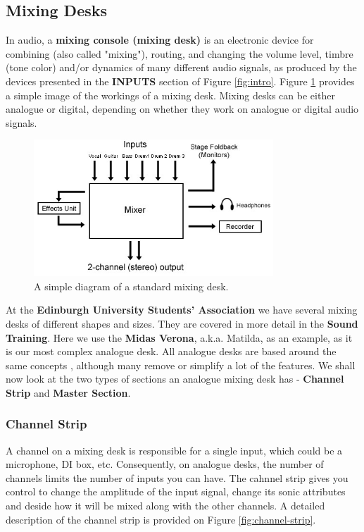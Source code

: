 \documentclass[14pt,twocolumn]{extarticle} %
\begin{document}
\subsection{Mixing Desks}
\label{mixing-desks}
In audio, a \textbf{mixing console (mixing desk)} is an electronic device for combining (also called "mixing"), routing, and changing the volume level, timbre (tone color) and/or dynamics of many different audio signals, as produced by the devices presented in the \textbf{INPUTS} section of Figure \ref{fig:intro}. Figure \ref{fig:mixing-desk} provides a simple image of the workings of a mixing desk. Mixing desks can be either analogue or digital, depending on whether they work on analogue or digital audio signals. 

\begin{figure}[h]
\begin{center}

\includegraphics[width=9cm]{mixing-desk3.jpg}
\caption{A simple diagram of a standard mixing desk.}
\label{fig:mixing-desk}

\end{center}
\end{figure}

At the \textbf{Edinburgh University Students' Association} we have several mixing desks of different shapes and sizes. They are covered in more detail in the \textbf{Sound Training}. Here we use the \textbf{Midas Verona}, a.k.a. Matilda, as an example, as it is our most complex analogue desk. All analogue desks are based around the same concepts , although many remove or simplify a lot of the features. We shall now look at the two types of sections an analogue mixing desk has - \textbf{Channel Strip} and \textbf{Master Section}.


\subsubsection{Channel Strip}
\label{channel-strip}
A channel on a mixing desk is responsible for a single input, which could be a microphone, DI box, etc. Consequently, on analogue desks, the number of channels limits the number of inputs you can have. The cahnnel strip gives you control to change the amplitude of the input signal, change its sonic attributes and deside how it will be mixed along with the other channels. A detailed description of the channel strip is provided on Figure \ref{fig:channel-strip}.
\end{document}
